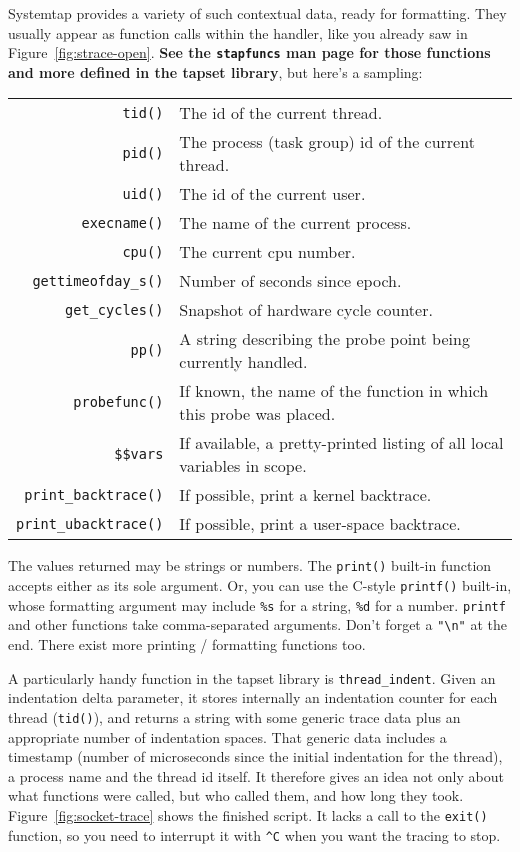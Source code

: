 \documentclass{article}
\begin{document}
Systemtap provides a variety of such contextual data, ready for
formatting.  They usually appear as function calls within the handler,
like you already saw in Figure~\ref{fig:strace-open}.  {\bf See the
\verb+stapfuncs+ man page for those functions and more defined in the
tapset library}, but here's a sampling:

\begin{tabular}{rl}
\verb+tid()+ & The id of the current thread. \\
\verb+pid()+ & The process (task group) id of the current thread. \\
\verb+uid()+ & The id of the current user. \\
\verb+execname()+ & The name of the current process. \\
\verb+cpu()+ & The current cpu number. \\
\verb+gettimeofday_s()+ & Number of seconds since epoch. \\
\verb+get_cycles()+ & Snapshot of hardware cycle counter. \\
\verb+pp()+ & A string describing the probe point being currently handled. \\
\verb+probefunc()+ & If known, the name of the function in which
                     this probe was placed. \\
\verb+$$vars+ & If available, a pretty-printed listing of all local
                variables in scope. \\
\verb+print_backtrace()+ & If possible, print a kernel backtrace. \\
\verb+print_ubacktrace()+ & If possible, print a user-space backtrace. \\
\end{tabular}

The values returned may be strings or numbers.  The \verb+print()+
built-in function accepts either as its sole argument.  Or, you can
use the C-style \verb+printf()+ built-in, whose formatting argument
may include \verb+%s+ for a string, \verb+%d+ for a number.
\verb+printf+ and other functions take comma-separated arguments.
Don't forget a \verb+"\n"+ at the end.  There exist more printing /
formatting functions too.

A particularly handy function in the tapset library is
\verb+thread_indent+.  Given an indentation delta parameter, it stores
internally an indentation counter for each thread (\verb+tid()+), and
returns a string with some generic trace data plus an appropriate
number of indentation spaces.  That generic data includes a timestamp
(number of microseconds since the initial indentation for the thread), a
process name and the thread id itself.  It therefore gives an idea not
only about what functions were called, but who called them, and how
long they took.  Figure~\ref{fig:socket-trace} shows the finished
script.  It lacks a call to the \verb+exit()+ function, so you need to
interrupt it with \verb+^C+ when you want the tracing to stop.
\end{document}
